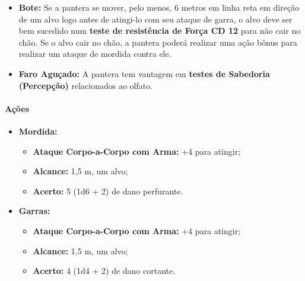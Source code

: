 \documentclass[a4paper,12p]{book}
\begin{document}
\begin{multicols}{2}
\begin{itemize}
			\item \textbf{Bote:} Se a pantera se mover, pelo menos, 6 metros em linha reta em direção de um alvo logo antes de atingi-lo com seu ataque de garra, o alvo deve ser bem sucedido num \textbf{teste de resistência de Força CD 12} para não cair no chão. Se o alvo cair no chão, a pantera poderá realizar uma ação bônus para realizar um ataque
			de mordida contra ele. 
			
			\item \textbf{Faro Aguçado:} A pantera tem vantagem em \textbf{testes de Sabedoria (Percepção)} relacionados ao olfato.
			
			
		\end{itemize}
		
		\paragraph{Ações}
		
		
		\begin{itemize}
			\item \textbf{Mordida:} 
			\begin{itemize}
				\item \textbf{Ataque Corpo-a-Corpo com Arma:} +4 para atingir;
				\item \textbf{Alcance:} 1,5 m, um alvo; 
				\item \textbf{Acerto:} 5 (1d6 + 2) de dano perfurante.
			\end{itemize}
			
			\item \textbf{Garras:} 
			\begin{itemize}
				\item \textbf{Ataque Corpo-a-Corpo com Arma:} +4 para atingir;
				\item \textbf{Alcance:} 1,5 m, um alvo; 
				\item \textbf{Acerto:} 4 (1d4 + 2) de dano cortante.
			\end{itemize}
		\end{itemize}
	
	
			
	\vfill\null
	\end{multicols}

	\pagebreak
\end{document}
